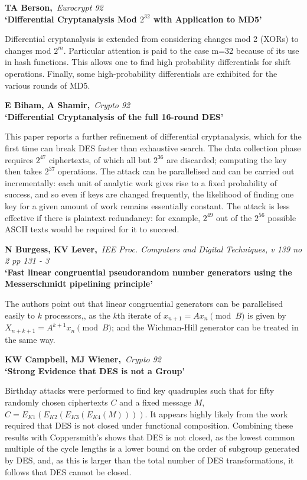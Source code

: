 {\bf \noindent TA Berson,}{\em ~Eurocrypt 92\\}
{\bf `Differential Cryptanalysis Mod $2^{32}$ with Application to MD5'}

Differential cryptanalysis is extended from considering changes mod 2 (XORs) 
to changes mod $2^m$. Particular attention is paid to the case m=32 because of
its use in hash functions. This allows one to find high probability
differentials for shift operations. Finally, some high-probability 
differentials are exhibited for the various rounds of MD5.

{\bf \noindent E Biham, A Shamir,}{\em ~Crypto 92\\}
{\bf `Differential Cryptanalysis of the full 16-round DES'}

This paper reports a further refinement of differential cryptanalysis, 
which for the first time can break DES faster than exhaustive search.
The data collection phase requires $2^{47}$ ciphertexts, of which all
but $2^{36}$ are discarded; computing the key then takes $2^{37}$ operations.
The attack can be parallelised and can be carried out incrementally: each
unit of analytic work gives rise to a fixed probability of success, and
so even if keys are changed frequently, the likelihood of finding one key
for a given amount of work remains essentially constant. The attack is
less effective if there is plaintext redundancy: for example, $2^{49}$ out
of the $2^{56}$ possible ASCII texts would be required for it to succeed.

{\bf \noindent N Burgess, KV Lever,}{\em ~IEE Proc. Computers and Digital
Techniques, v 139 no 2 pp 131 - 3\\}
{\bf `Fast linear congruential pseudorandom number generators using the
Messerschmidt pipelining principle'}

The authors point out that linear congruential generators can be parallelised
easily to $k$ processors,, as the $k$th iterate of $x_{n+1} = Ax_n \pmod{B}$ 
is given by $X_{n+k+1} = A^{k+1}x_n \pmod{B}$; and the Wichman-Hill generator 
can be treated in the same way.

{\bf \noindent KW Campbell, MJ Wiener,}{\em ~Crypto 92\\}
{\bf `Strong Evidence that DES is not a Group'}

Birthday attacks were performed to find key quadruples such that for
fifty randomly chosen ciphertexts $C$ and a fixed message $M$, 
$C = E_{K1}(E_{K2}(E_{K3}(E_{K4}(M))))$. It appears highly likely from the 
work required that DES is not closed under functional composition.
Combining these results with Coppersmith's shows that DES is not closed, as 
the lowest common multiple of the cycle lengths is a lower bound on the order 
of subgroup generated by DES, and, as this is larger than the total number of 
DES transformations, it follows that DES cannot be closed.

